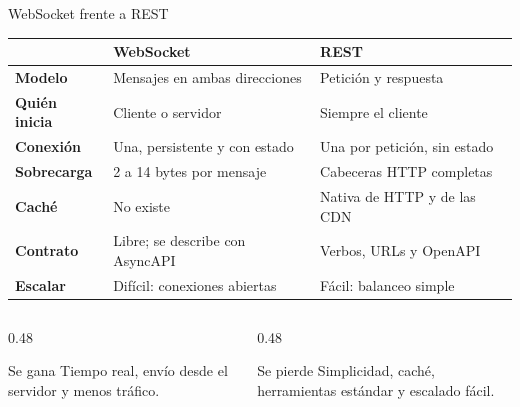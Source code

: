 \documentclass[aspectratio=169,11pt]{beamer}
\newcommand{\bloqueactual}{0}
\newcommand{\quienhabla}{}
\newcommand{\seccion}[2]{\gdef\bloqueactual{#1}\gdef\quienhabla{#2}}
\begin{document}
\seccion{6}{Jan}
\begin{frame}{WebSocket frente a REST}
  \small
  \renewcommand{\arraystretch}{1.12}
  \begin{tabularx}{\textwidth}{>{\bfseries}l X X}
    \toprule
     & \textcolor{acento}{WebSocket} & \textcolor{naranja!85!azul}{REST} \\
    \midrule
    Modelo & Mensajes en ambas direcciones & Petición y respuesta \\
    Quién inicia & Cliente o servidor & Siempre el cliente \\
    Conexión & Una, persistente y con estado & Una por petición, sin estado \\
    Sobrecarga & 2 a 14 bytes por mensaje & Cabeceras HTTP completas \\
    Caché & No existe & Nativa de HTTP y de las CDN \\
    Contrato & Libre; se describe con AsyncAPI & Verbos, URLs y OpenAPI \\
    Escalar & Difícil: conexiones abiertas & Fácil: balanceo simple \\
    \bottomrule
  \end{tabularx}

  \vspace{0.15cm}
  \begin{columns}[T]
    \begin{column}{0.48\textwidth}
      \begin{exampleblock}{Se gana}
        \small Tiempo real, envío desde el servidor y menos tráfico.
      \end{exampleblock}
    \end{column}
    \begin{column}{0.48\textwidth}
      \begin{alertblock}{Se pierde}
        \small Simplicidad, caché, herramientas estándar y escalado fácil.
      \end{alertblock}
    \end{column}
  \end{columns}
\end{frame}
\end{document}
